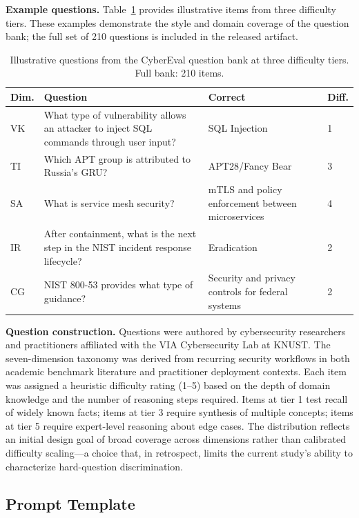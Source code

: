 \documentclass[journal]{IEEEtran}
\begin{document}
\textbf{Example questions.} Table~\ref{tab:examples} provides illustrative items from three difficulty tiers. These examples demonstrate the style and domain coverage of the question bank; the full set of 210 questions is included in the released artifact.

\begin{table}[t]
\centering
\caption{Illustrative questions from the CyberEval question bank at three difficulty tiers. Full bank: 210 items.}
\label{tab:examples}
\scriptsize
\begin{tabular}{lp{6cm}ll}
\toprule
\textbf{Dim.} & \textbf{Question} & \textbf{Correct} & \textbf{Diff.} \\
\midrule
VK & What type of vulnerability allows an attacker to inject SQL commands through user input? & SQL Injection & 1 \\
TI & Which APT group is attributed to Russia's GRU? & APT28/Fancy Bear & 3 \\
SA & What is service mesh security? & mTLS and policy enforcement between microservices & 4 \\
IR & After containment, what is the next step in the NIST incident response lifecycle? & Eradication & 2 \\
CG & NIST 800-53 provides what type of guidance? & Security and privacy controls for federal systems & 2 \\
\bottomrule
\end{tabular}
\end{table}

\textbf{Question construction.} Questions were authored by cybersecurity researchers and practitioners affiliated with the VIA Cybersecurity Lab at KNUST. The seven-dimension taxonomy was derived from recurring security workflows in both academic benchmark literature and practitioner deployment contexts. Each item was assigned a heuristic difficulty rating (1--5) based on the depth of domain knowledge and the number of reasoning steps required. Items at tier 1 test recall of widely known facts; items at tier 3 require synthesis of multiple concepts; items at tier 5 require expert-level reasoning about edge cases. The distribution reflects an initial design goal of broad coverage across dimensions rather than calibrated difficulty scaling---a choice that, in retrospect, limits the current study's ability to characterize hard-question discrimination.

\subsection{Prompt Template}
\end{document}
